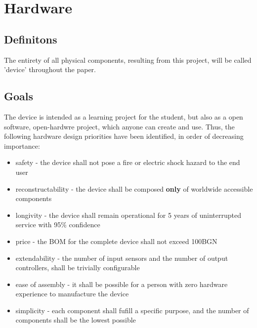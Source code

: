 \section{Hardware}
\subsection{Definitons}
The entirety of all physical components, resulting from this project, will be called 'device' throughout the paper.

\subsection{Goals}
The device is intended as a learning project for the student, but also as a open software, open-hardwre project, which anyone can create and use.
Thus, the following hardware design priorities have been identified, in order of decreasing importance:
\begin{itemize}
\item{safety - the device shall not pose a fire or electric shock hazard to the end user}
\item{reconstructability - the device shall be composed \textbf{only} of worldwide accessible components}
\item{longivity - the device shall remain operational for 5 years of uninterrupted service with 95\% confidence}
\item{price - the BOM for the complete device shall not exceed 100BGN}
\item{extendability - the number of input sensors and the number of output controllers, shall be trivially configurable}
\item{ease of assembly - it shall be possible for a person with zero hardware experience to manufacture the device}
\item{simplicity - each component shall fufill a specific purpose, and the number of components shall be the lowest possible}
\end{itemize}

